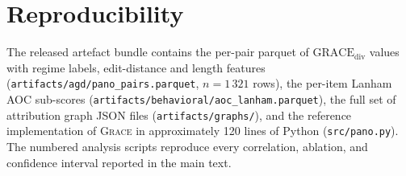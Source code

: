 \documentclass{article}
\newcommand{\GRACE}{\textsc{Grace}}
\newcommand{\gdiv}{\mathrm{GRACE}_{\text{div}}}
\begin{document}
\section{Reproducibility}
\label{app:repro}

The released artefact bundle contains the per-pair parquet of $\gdiv$
values with regime labels, edit-distance and length features
(\texttt{artifacts/agd/pano\_pairs.parquet}, $n = 1\,321$ rows), the
per-item Lanham AOC sub-scores
(\texttt{artifacts/behavioral/aoc\_lanham.parquet}), the full set of
attribution graph JSON files (\texttt{artifacts/graphs/}), and the
reference implementation of \GRACE{} in approximately 120 lines of
Python (\texttt{src/pano.py}). The numbered analysis scripts reproduce
every correlation, ablation, and confidence interval reported in the
main text.
\end{document}
